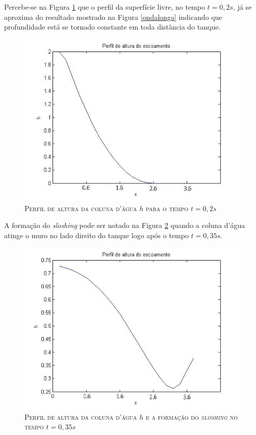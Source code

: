  Percebe-se na Figura \ref{Alt2s} que o perfil da superfície livre, no tempo $t=0,2s$, já se aproxima do resultado mostrado na Figura \ref{ondalonga} indicando que profundidade está se tornado constante em toda distância do tanque.
 \begin{figure}[H]
 	\centering
 	\includegraphics[scale=1]{figuras/Alt2s.jpg}
 	\caption{\textsc{Perfil de altura da coluna d'água $h$ para o tempo $t=0,2s$}}
 	\vspace{-0.1cm}
 	\label{Alt2s}
 \end{figure}
 
 A formação do \textit{sloshing} pode ser notado na Figura \ref{Alt35s} quando a coluna d'água atinge o muro no lado direito do tanque logo após o tempo $t=0,35s$.
 \begin{figure}[H]
 	\centering
 	\includegraphics[scale=1]{figuras/Alt35s.jpg}
 	\caption{\textsc{Perfil de altura da coluna d'água $h$ e a formação do \textit{sloshing} no tempo $t=0,35s$}}
 	\vspace{-0.1cm}
 	\label{Alt35s}
 \end{figure}
 
